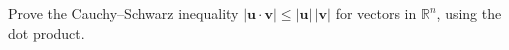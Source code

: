 Prove the Cauchy--Schwarz inequality $|\mathbf u\cdot\mathbf v|\le|\mathbf u|\,|\mathbf v|$ for vectors in $\mathbb R^n$, using the dot product.
